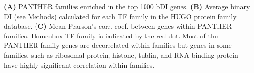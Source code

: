 \textbf{(A)} PANTHER families enriched in the top 1000 bDI genes.
\textbf{(B)} Average binary DI (see Methods) calculated for each TF family in the HUGO protein family database. 
\textbf{(C)} Mean Pearson's corr. coef. between genes within PANTHER families. Homeobox TF family is indicated by the red dot. Most of the PANTHER family genes are decorrelated within families but genes in some families, such as ribosomal protein, histone, tublin, and RNA binding protein have highly significant correlation within families. 
